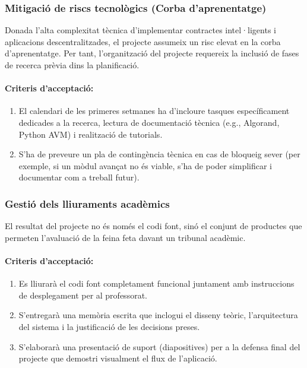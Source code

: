 \subsubsection{Mitigació de riscs tecnològics (Corba d'aprenentatge)}

Donada l'alta complexitat tècnica d'implementar contractes intel·ligents i aplicacions descentralitzades, el projecte assumeix un risc elevat en la corba d'aprenentatge. 
Per tant, l'organització del projecte requereix la inclusió de fases de recerca prèvia dins la planificació.

\paragraph{Criteris d'acceptació:}
\begin{enumerate}[label=\roman*.]
    \item El calendari de les primeres setmanes ha d'incloure tasques específicament dedicades a la recerca, lectura de documentació tècnica (e.g., Algorand, Python AVM) i realització de tutorials.
    \item S'ha de preveure un pla de contingència tècnica en cas de bloqueig sever (per exemple, si un mòdul avançat no és viable, s'ha de poder simplificar i documentar com a treball futur).
\end{enumerate}

\subsubsection{Gestió dels lliuraments acadèmics}

El resultat del projecte no és només el codi font, sinó el conjunt de productes que permeten l'avaluació de la feina feta davant un tribunal acadèmic.

\paragraph{Criteris d'acceptació:}
\begin{enumerate}[label=\roman*.]
    \item Es lliurarà el codi font completament funcional juntament amb instruccions de desplegament per al professorat.
    \item S'entregarà una memòria escrita que inclogui el disseny teòric, l'arquitectura del sistema i la justificació de les decisions preses.
    \item S'elaborarà una presentació de suport (diapositives) per a la defensa final del projecte que demostri visualment el flux de l'aplicació.
\end{enumerate}


